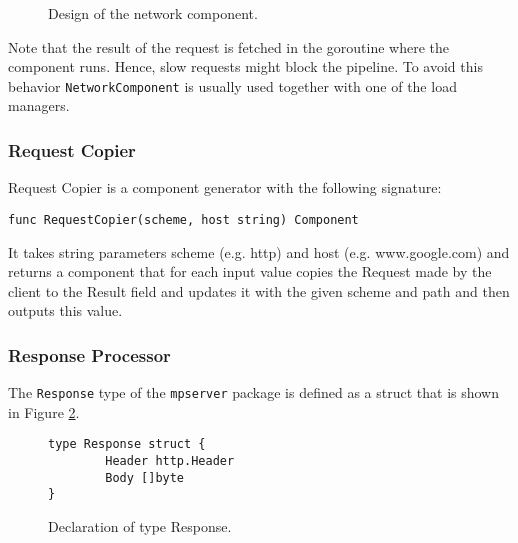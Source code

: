 \begin{figure}[h]
\centering
{}
\caption[scale=1.0]{Design of the network component.}
\label{fig:networkComp}
\end{figure}

Note that the result of the request is fetched in the goroutine where the
component runs. Hence, slow requests might block the pipeline. To avoid
this behavior \texttt{NetworkComponent} is usually used together with one
of the load managers.

\subsubsection{Request Copier}
Request Copier is a component generator with the following signature:
\begin{lstlisting}
func RequestCopier(scheme, host string) Component
\end{lstlisting}
It takes string parameters scheme (e.g. http) and host (e.g. www.google.com) 
and returns a component that for each input value copies the Request made 
by the client to the Result field and updates it with the given scheme and 
path and then outputs this value.

\subsubsection{Response Processor}
The \texttt{Response} type of the \texttt{mpserver} package is defined as
a struct that is shown in Figure \ref{fig:Response}.
\begin{figure}[h]
\centering
\begin{lstlisting}
type Response struct {
		Header http.Header
		Body []byte
}
\end{lstlisting}
\caption[scale=1.0]{Declaration of type Response.}
\label{fig:Response}
\end{figure}

